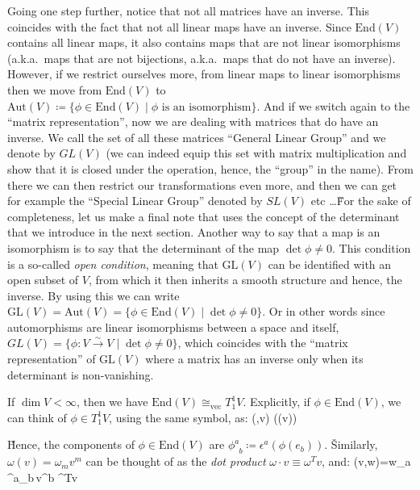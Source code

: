 Going one step further, notice that not all matrices have an inverse. This coincides with the fact that not all
linear maps have an inverse. Since $\mathrm{End}(V)$ contains all linear maps, it also contains maps that are not
linear isomorphisms (a.k.a.\ maps that are not bijections, a.k.a.\ maps that do not have an inverse). However, if we
restrict ourselves more, from linear maps to linear isomorphisms then we move from $\mathrm{End}(V)$ to $
\mathrm{Aut}(V) \coloneqq \{\phi \in \mathrm{End}(V) \mid \phi \text{ is an isomorphism}\}$. And if we switch again
to the ``matrix representation'', now we are dealing with matrices that do have an inverse. We call the set of all
these matrices ``General Linear Group'' and we denote by $GL(V)$ (we can indeed equip this set with matrix
multiplication and show that it is closed under the operation, hence, the ``group'' in the name). From there we can
then restrict our transformations even more, and then we can get for example the ``Special Linear Group'' denoted by
$SL(V)$ etc \ldots \v

For the sake of completeness, let us make a final note that uses the concept of the determinant that we introduce in
the next section. Another way to say that a map is an isomorphism is to say that the determinant of the map $\det
\phi\neq 0$. This condition is a so-called \emph{open condition}, meaning that $\mathrm{GL}(V)$ can be identified
with an open subset of $V$, from which it then inherits a smooth structure and hence, the inverse. By using this we
can write $\mathrm{GL}(V)= \mathrm{Aut}(V) = \{\phi \in \mathrm{End}(V) \mid \det \phi \neq 0 \}$. Or in other words
since automorphisms are linear isomorphisms between a space and itself, $ GL(V) = \{\phi: V \xrightarrow{\sim} V \mid
\det \phi \neq 0\}$, which coincides with the ``matrix representation'' of $\mathrm{GL}(V)$ where a matrix has an
inverse only when its determinant is non-vanishing.

\be
If $\dim V<\infty$, then we have $\mathrm{End}(V)\cong_\mathrm{vec}T^1_1 V$. Explicitly, if $\phi \in \mathrm{End}(V)
$, we can think of $\phi \in T^1_1 V$, using the same symbol, as:
\bse
\phi(\omega,v) \coloneqq \omega(\phi(v))
\ese

\v

Hence, the components of $\phi\in\mathrm{End}(V)$ are $\phi^a_{\phantom{a}b} \coloneqq \epsilon^a(\phi(e_b))$. \v

Similarly, $\omega(v)=\omega_m v^m$ can be thought of as the \emph{dot product} $\omega \cdot v\equiv\omega^T v$, and:
\bse
\phi(v,w)=w_a\,\phi^a_{\phantom{a}b}\,v^b \quad \leftrightsquigarrow \quad \omega^T\phi v
\ese

